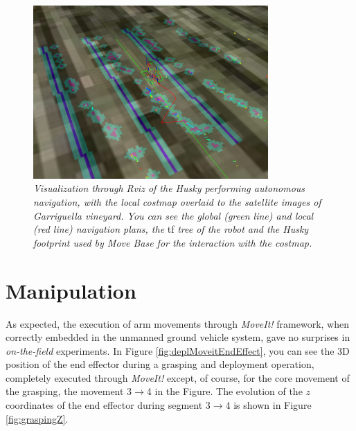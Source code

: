\begin{figure}
	\centering
	\includegraphics[width=0.8\textwidth]{Images/experimental_data/navigation2_gimped.png}
	\caption{\textit{Visualization through Rviz of the Husky performing autonomous navigation, with the local costmap overlaid to the satellite images of Garriguella vineyard. You can see the global (green line) and local (red line) navigation plans, the} tf \textit{tree of the robot and the Husky footprint used by Move Base for the interaction with the costmap.}}
	\label{fig:result_navigation}
\end{figure}


\section{Manipulation}

As expected, the execution of arm movements through \textit{MoveIt!} framework, when correctly embedded in the unmanned ground vehicle system, gave no surprises in \textit{on-the-field} experiments. In Figure \ref{fig:deplMoveitEndEffect}, you can see the 3D position of the end effector during a grasping and deployment operation, completely executed through \textit{MoveIt!} except, of course, for the core movement of the grasping, the movement 3$\rightarrow$4 in the Figure. The evolution of the $z$ coordinates of the end effector during segment 3$\rightarrow$4 is shown in Figure \ref{fig:graspingZ}.

